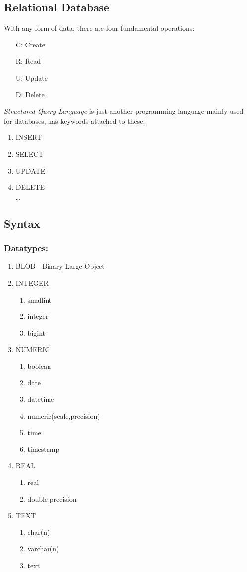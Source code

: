 \subsection{Relational Database}
With any form of data, there are four fundamental operations:
\begin{enumerate}
	\item[C:] Create
	\item[R:] Read
	\item[U:] Update
	\item[D:] Delete
\end{enumerate}
\emph{Structured Query Language} is just another programming language
mainly used for databases, has keywords attached to these:
\begin{enumerate}
	\item INSERT
	\item SELECT
	\item UPDATE
	\item DELETE \\
	      \dots
\end{enumerate}

\subsection{Syntax}
\subsubsection{Datatypes:}
\begin{enumerate}
	\item BLOB - Binary Large Object
	\item INTEGER
	      \begin{enumerate}
		      \item smallint
		      \item integer
		      \item bigint
	      \end{enumerate}
	\item NUMERIC
	      \begin{enumerate}
		      \item boolean
		      \item date
		      \item datetime
		      \item numeric(scale,precision)
		      \item time
		      \item timestamp
	      \end{enumerate}
	\item REAL
	      \begin{enumerate}
		      \item real
		      \item double precision
	      \end{enumerate}
	\item TEXT
	      \begin{enumerate}
		      \item char(n)
		      \item varchar(n)
		      \item text
	      \end{enumerate}
\end{enumerate}
